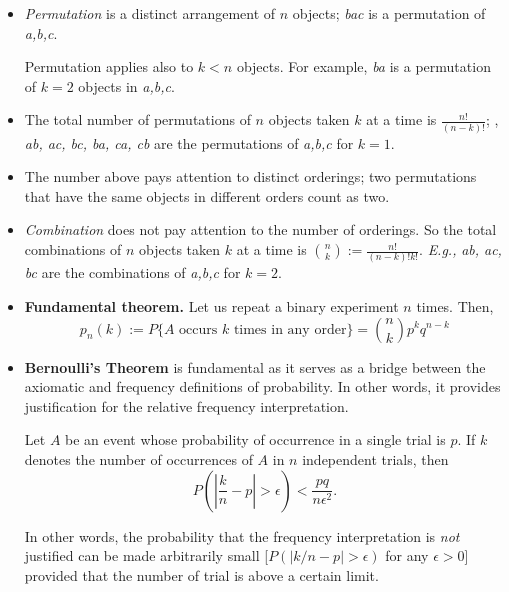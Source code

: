 \documentclass[a4paper, oneside]{book}
\begin{document}
\begin{itemize}
\item \textit{Permutation} is a distinct arrangement of $n$ objects; \eg \textit{bac} is a permutation of \textit{a,b,c}.

Permutation applies also to $k<n$ objects. For example, \textit{ba} is a permutation of $k=2$ objects in \textit{a,b,c}.

\item The total number of permutations of $n$ objects taken $k$ at a time is $\frac{n!}{(n-k)!}$; \eg, \textit{ab, ac, bc, ba, ca, cb} are the permutations of \textit{a,b,c} for $k=1$.

\item The number above pays attention to distinct orderings; \ie two permutations that have the same objects in different orders count as two.

\item \textit{Combination} does not pay attention to the number of orderings. So the total combinations of $n$ objects taken $k$ at a time is $\binom nk:=\frac{n!}{(n-k)!k!}$. \textit{E.g.,} \textit{ab, ac, bc} are the combinations of \textit{a,b,c} for $k=2$.

\item \textbf{Fundamental theorem. } Let us repeat a binary experiment $n$ times. Then, %
$$p_n(k):=P\{\text{$A$ occurs $k$ times in any order}\}=\binom n k p^k q^{n-k}$$

\item \textbf{Bernoulli's Theorem} is fundamental as it serves as a bridge between the axiomatic and frequency definitions of probability. In other words, it provides justification for the relative frequency interpretation.

Let $A$ be an event whose probability of occurrence in a single trial is $p$. If $k$ denotes the number of occurrences of $A$ in $n$ independent trials, then%
$$P\left(\left| \frac{k}{n}-p\right|>\epsilon\right)<\frac{pq}{n\epsilon^2}.$$

In other words, the probability that the frequency interpretation is \textit{not} justified can be made arbitrarily small [\ie $P(|k/n-p|>\epsilon)$ for any $\epsilon>0$] provided that the number of trial is above a certain limit. 
  
\end{itemize}
\end{document}
